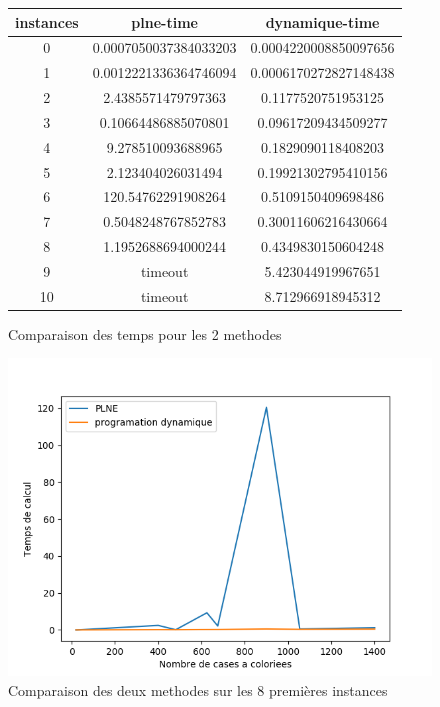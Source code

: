 \documentclass[a4paper]{memoir}
\begin{document}
\begin{figure}
  \begin{center}
\begin{tabular}{|c||c||c|}
\hline
instances & plne-time & dynamique-time \\ 
\hline
0 & 0.0007050037384033203 & 0.0004220008850097656 \\ 
\hline
1 & 0.0012221336364746094 & 0.0006170272827148438 \\ 
\hline
2 & 2.4385571479797363 & 0.1177520751953125 \\ 
\hline
3 & 0.10664486885070801 & 0.09617209434509277 \\ 
\hline
4 & 9.278510093688965 & 0.1829090118408203 \\ 
\hline
5 & 2.123404026031494 & 0.19921302795410156 \\ 
\hline
6 & 120.54762291908264 & 0.5109150409698486 \\ 
\hline
7 & 0.5048248767852783 & 0.30011606216430664 \\ 
\hline
8 & 1.1952688694000244 & 0.4349830150604248 \\ 
\hline
9 & timeout & 5.423044919967651 \\ 
\hline
10 & timeout & 8.712966918945312 \\ 
\hline
\end{tabular}

\caption{Comparaison des temps pour les 2 methodes}
  \end{center}
  \end{figure}


\begin{figure}[h]
  \centering
  \includegraphics[width=0.75\linewidth]{../graphes/comparaison.png}
  \caption{Comparaison des deux methodes sur les 8 premières instances}
  \label{fig:graphes-comparaison}
\end{figure}
\end{document}
